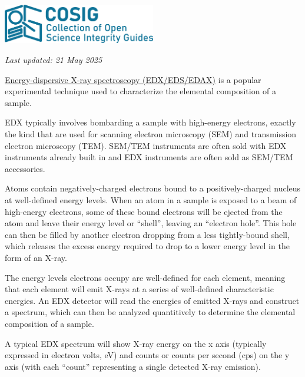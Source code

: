 \documentclass[letterpaper, 12pt]{article}
\begin{document}
\flushleft\includegraphics[width=0.5\textwidth]{img/home/241017_final_logo_mockup.png}

\textit{Last updated: 21 May 2025}

\href{https://en.wikipedia.org/wiki/Energy-dispersive_X-ray_spectroscopy}{Energy-dispersive X-ray spectroscopy (EDX/EDS/EDAX)} is a popular experimental technique used to characterize the elemental composition of a sample.

EDX typically involves bombarding a sample with high-energy electrons, exactly the kind that are used for scanning electron microscopy (SEM) and transmission electron microscopy (TEM). SEM/TEM instruments are often sold with EDX instruments already built in and EDX instruments are often sold as SEM/TEM accessories.

Atoms contain negatively-charged electrons bound to a positively-charged nucleus at well-defined energy levels. When an atom in a sample is exposed to a beam of high-energy electrons, some of these bound electrons will be ejected from the atom and leave their energy level or ``shell'', leaving an ``electron hole''. This hole can then be filled by another electron dropping from a less tightly-bound shell, which releases the excess energy required to drop to a lower energy level in the form of an X-ray.

The energy levels electrons occupy are well-defined for each element, meaning that each element will emit X-rays at a series of well-defined characteristic energies. An EDX detector will read the energies of emitted X-rays and construct a spectrum, which can then be analyzed quantitively to determine the elemental composition of a sample.

A typical EDX spectrum will show X-ray energy on the x axis (typically expressed in electron volts, eV) and counts or counts per second (cps) on the y axis (with each ``count'' representing a single detected X-ray emission).
\end{document}
